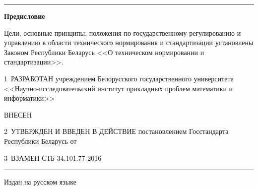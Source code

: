 \hrule

\rule{0pt}{5mm}

\centerline{\bf Предисловие} 

Цели, основные принципы, положения по государственному регулированию и 
управлению в области технического нормирования и стандартизации 
установлены Законом Республики Беларусь <<О техническом нормировании и 
стандартизации>>.  

\vskip0.2cm

1~РАЗРАБОТАН учреждением Белорусского государственного университета 
<<Науч\-но-исследовательский институт прикладных проблем математики и 
информатики>> 

ВНЕСЕН  

2~УТВЕРЖДЕН И ВВЕДЕН В ДЕЙСТВИЕ постановлением Госстандарта Республики 
Беларусь от $\phantom{\text{12 августа 2016 г.}}$ \No~$\phantom{\text{62}}$

3~ВЗАМЕН СТБ 34.101.77-2016

\vfill
\hrule
\vskip1mm
Издан на русском языке

\pagebreak
